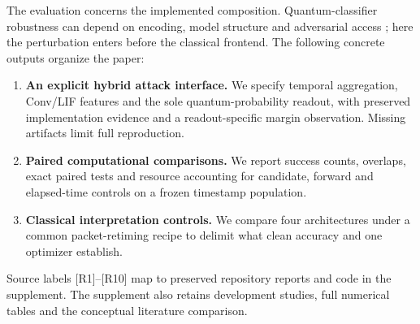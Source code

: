 The evaluation concerns the implemented composition. Quantum-classifier robustness can depend on encoding, model structure and adversarial access \cite{wendlinger2024comparative,gong2024randomized,dowling2026guarantees}; here the perturbation enters before the classical frontend. The following concrete outputs organize the paper:
\begin{enumerate}
\item \textbf{An explicit hybrid attack interface.} We specify temporal aggregation, Conv/LIF features and the sole quantum-probability readout, with preserved implementation evidence and a readout-specific margin observation. Missing artifacts limit full reproduction.
\item \textbf{Paired computational comparisons.} We report success counts, overlaps, exact paired tests and resource accounting for candidate, forward and elapsed-time controls on a frozen timestamp population.
\item \textbf{Classical interpretation controls.} We compare four architectures under a common packet-retiming recipe to delimit what clean accuracy and one optimizer establish.
\end{enumerate}
Source labels [R1]--[R10] map to preserved repository reports and code in the supplement. The supplement also retains development studies, full numerical tables and the conceptual literature comparison.
